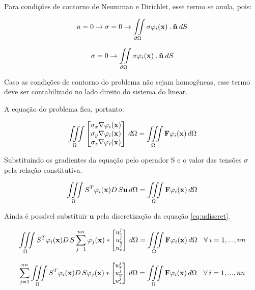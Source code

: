 Para condições de contorno de Neumman e Dirichlet, esse termo se anula, pois:

\begin{equation*}
    u = 0 \rightarrow \sigma = 0 \rightarrow \iint\limits_{\partial \Omega} \sigma \varphi_i(\mathbf{x}) \: . \: \mathbf{\hat{n}} \: dS
\end{equation*}

\begin{equation*}
     \sigma = 0 \rightarrow \iint\limits_{\partial \Omega} \sigma \varphi_i(\mathbf{x}) \: . \: \mathbf{\hat{n}} \: dS
\end{equation*}

Caso as condições de contorno do problema não sejam homogêneas, esse termo deve ser contabilizado no lado direito do sistema do linear.

A equação do problema fica, portanto:

\begin{equation}
\iiint\limits_{\Omega} 
\begin{bmatrix}
 \sigma_x \nabla \varphi_i(\mathbf{x})\\  \sigma_y \nabla \varphi_i(\mathbf{x}) \\  \sigma_z \nabla \varphi_i(\mathbf{x})
\end{bmatrix} \, d\Omega
= \iiint\limits_{\Omega} \mathbf{F}\varphi_i(\mathbf{x}) \, d\Omega
\end{equation}


Substituindo os gradientes da equação pelo operador S e o valor das tensões $\sigma$ pela relação constitutiva.

\begin{equation}
\iiint\limits_{\Omega} S^T \varphi_i(\mathbf{x}) D\,S\mathbf{u}  \, d\Omega
= \iiint\limits_{\Omega} \mathbf{F}\varphi_i(\mathbf{x}) \, d\Omega
\end{equation}

Ainda é possível substituir $\mathbf{u}$ pela discretização da equação \ref{eq:udiscret}.

\begin{equation}\small
\iiint\limits_{\Omega} S^T \varphi_i(\mathbf{x}) D\,S \sum_{j=1}^{nn}  \varphi_j(\mathbf{x})
 * \begin{bmatrix} u^j_x \\ u^j_y \\ u^j_z \end{bmatrix}
 \, d\Omega   =  \iiint\limits_{\Omega} \mathbf{F}\varphi_i(\mathbf{x}) \, d\Omega \quad \forall \: i=1,...,nn
\end{equation}


\begin{equation}\small
\sum_{j=1}^{nn} \iiint\limits_{\Omega} S^T \varphi_i(\mathbf{x}) D\,S   \varphi_j(\mathbf{x})
 * \begin{bmatrix} u^j_x \\ u^j_y \\ u^j_z \end{bmatrix}
 \, d\Omega   =  \iiint\limits_{\Omega} \mathbf{F}\varphi_i(\mathbf{x}) \, d\Omega \quad \forall \: i=1,...,nn
\end{equation}

